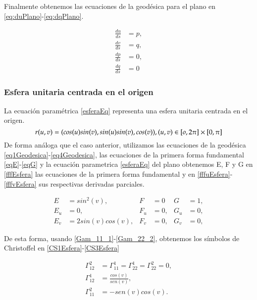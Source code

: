 \documentclass{endm}
\begin{document}
Finalmente obtenemos las ecuaciones de la geod\'esica para el plano en \ref{eq:duPlano}-\ref{eq:dqPlano}.

\begin{align}
\frac{du}{ds}&=p,\label{eq:duPlano} \\
\frac{dv}{ds}&=q,\label{eq:dvPlano}     \\
\frac{dp}{ds}&=0, \label{eq:dpPlano}\\ 
\frac{dq}{ds}&=0 \label{eq:dqPlano}
\end{align}

\subsubsection{Esfera unitaria centrada en el origen}

La ecuaci\'on param\'etrica \ref{esferaEq} representa una esfera unitaria centrada en el origen.
\begin{equation} \label{esferaEq}
r(u,v) = (cos (u) sin(v), sin (u) sin (v),cos (v)), \\
(u,v) \in  [o, 2 \pi] \times [0, \pi]
\end{equation}
De forma an\'aloga que el caso anterior, utilizamos las ecuaciones de la geod\'esica \ref{eq1Geodesica}-\ref{eq4Geodesica}, las ecuaciones de la primera forma fundamental \ref{eqE}-\ref{eqG} y la ecuaci\'on parametrica \ref{esferaEq} del plano obtenemos E, F y G en \ref{fffEsfera} las ecuaciones de la primera forma fundamental y en \ref{fffuEsfera}-\ref{fffvEsfera} sus respectivas derivadas parciales.

\begin{align} \label{fffHipEq}
E&=sin^2 (v),   & F &=0    & G&=1, \label{fffEsfera} \\
E_u&=0,     & F_u&=0,   & G_u&=0, \label{fffuEsfera}\\
E_v&=2sin(v)cos(v),    & F_v&=0,   & G_v&=0, \label{fffvEsfera}
\end{align}

De esta forma, usando \ref{Gam_11_1}-\ref{Gam_22_2}, obtenemos los s\'imbolos de Christoffel en \ref{CS1Esfera}-\ref{CS3Esfera}

\begin{align}
\Gamma_{12}^2&=\Gamma_{11}^1=\Gamma_{22}^1=\Gamma_{22}^2=0, \label{CS1Esfera} \\
\Gamma_{12}^1&=\frac{cos(v)}{sen(v)},  \label{CS2Esfera}   \\
\Gamma_{11}^2&=-sen(v)cos(v) .  \label{CS3Esfera}
\end{align}
\end{document}
